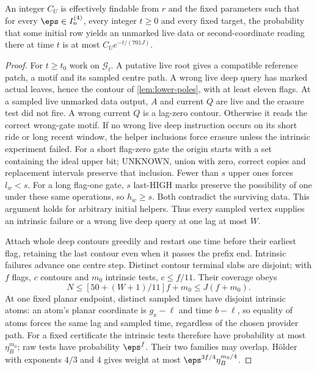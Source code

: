 \begin{lemma}\label{lem:lower-unmarked}
An integer $C_U$ is effectively findable from $r$ and the fixed parameters such that for every $\eps\in I_n^{(4)}$, every integer $t\ge0$ and every fixed target, the probability that some initial row yields an unmarked live data or second-coordinate reading there at time $t$ is at most $C_Ue^{-t/(701J)}$.
\end{lemma}
\begin{proof}
For $t\ge t_0$ work on $\mathcal G_t$. A putative live root gives a compatible reference patch, a motif and its sampled centre path. A wrong live deep query has marked actual leaves, hence the contour of \cref{lem:lower-poles}, with at least eleven flags. At a sampled live unmarked data output, $A$ and current $Q$ are live and the erasure test did not fire. A wrong current $Q$ is a lag-zero contour. Otherwise it reads the correct wrong-gate motif. If no wrong live deep instruction occurs on its short ride or long recent window, the helper inclusions force erasure unless the intrinsic experiment failed. For a short flag-zero gate the origin starts with a set containing the ideal upper bit; UNKNOWN, union with zero, correct copies and replacement intervals preserve that inclusion. Fewer than $s$ upper ones forces $l_w<s$. For a long flag-one gate, $s$ last-HIGH marks preserve the possibility of one under these same operations, so $h_w\ge s$. Both contradict the surviving data. This argument holds for arbitrary initial helpers. Thus every sampled vertex supplies an intrinsic failure or a wrong live deep query at one lag at most $W$.

Attach whole deep contours greedily and restart one time before their earliest flag, retaining the last contour even when it passes the prefix end. Intrinsic failures advance one centre step. Distinct contour terminal slabs are disjoint; with $f$ flags, $c$ contours and $m_0$ intrinsic tests, $c\le f/11$. Their coverage obeys
\[
 N\le[50+(W+1)/11]f+m_0\le J(f+m_0).
\]
At one fixed planar endpoint, distinct sampled times have disjoint intrinsic atoms: an atom's planar coordinate is $g_x-\ell$ and time $b-\ell$, so equality of atoms forces the same lag and sampled time, regardless of the chosen provider path. For a fixed certificate the intrinsic tests therefore have probability at most $\eta_B^{m_0}$; raw tests have probability $\eps^f$. Their two families may overlap. H\"older with exponents $4/3$ and $4$ gives weight at most $\eps^{3f/4}\eta_B^{m_0/4}$.


\end{proof}
